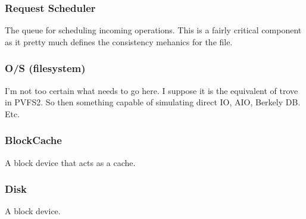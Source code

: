 \documentclass[11pt]{article}
\begin{document}
\subsubsection{Request Scheduler}
The queue for scheduling incoming operations.  This is a fairly critical
component as it pretty much defines the consistency mehanics for the file.

\subsubsection{O/S (filesystem)}
I'm not too certain what needs to go here.  I suppose it is the equivalent of
trove in PVFS2.  So then something capable of simulating direct IO, AIO,
Berkely DB.  Etc.

\subsubsection{BlockCache}
A block device that acts as a cache.

\subsubsection{Disk}
A block device.
\end{document}
